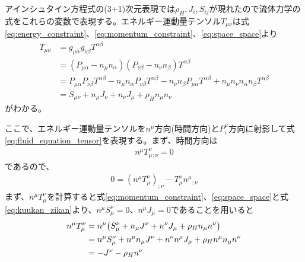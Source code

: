 \documentclass[autodetect-engine,dvi=dvipdfmx,ja=standard, 10pt, a4paper]{bxjsarticle}
\begin{document}
アインシュタイン方程式の(3+1)次元表現では$\rho_H, J_i, S_{ij}$が現れたので流体力学の式をこれらの変数で表現する。エネルギー運動量テンソル$T_{\mu\nu}$は式\eqref{eq:energy_constraint}、\eqref{eq:momentum_constraint}、\eqref{eq:space_space}より
\begin{align}
	T_{\mu\nu}& = g_{\mu\alpha}g_{\nu\beta}T^{\alpha\beta}\nonumber\\
	&=(P_{\mu\alpha} - n_\mu n_\alpha)(P_{\nu\beta} - n_\nu n_\beta)T^{\alpha\beta}\nonumber\\
	&=P_{\mu\alpha}P_{\nu\beta}T^{\alpha\beta} - n_\mu n_\alpha P_{\nu\beta}T^{\alpha\beta} - n_\nu n_\beta P_{\mu\alpha}T^{\alpha\beta} + n_\mu n_\nu n_\alpha n_\beta T^{\alpha\beta}\nonumber\\
	&= S_{\mu\nu} + n_\mu J_\nu + n_\nu J_\mu +\rho_H n_\mu n_\nu 
\end{align}
がわかる。

ここで、エネルギー運動量テンソルを$n^\mu$方向(時間方向)と$P_i^\mu$方向に射影して式\eqref{eq:fluid_equation_tensor}を表現する。まず、時間方向は
\begin{align}
	n^\mu T_{\mu}^{\nu}{}_{;\nu} = 0
\end{align}
であるので、
\begin{align}
	0 = (n^\mu T_{\mu}^{\nu})_{;\nu} - T_{\mu}^{\nu} n^\mu{}_{;\nu} 
\end{align}
まず、$n^\mu T_{\mu}^{\nu}$を計算すると式\eqref{eq:momentum_constraint}、\eqref{eq:space_space}と式\eqref{eq:kuukan_zikan}より、$n^\mu S_{\mu}^{\nu} = 0$、$n^\mu J_\mu = 0$であることを用いると
\begin{align}
	n^\mu T_{\mu}^{\nu} &= n^\mu \qty( S_{\mu}^{\nu} + n_\mu J^{\nu} + n^{\nu} J_\mu + \rho_H n_\mu n^{\nu} )\nonumber\\
	&= n^\mu S_{\mu}^{\nu} + n^\mu n_\mu J^{\nu} + n^{\nu} n^\mu J_\mu + \rho_H n^\mu n_\mu n^{\nu} \nonumber\\
	&= - J^{\nu} -\rho_H n^{\nu}
\end{align}
\end{document}
